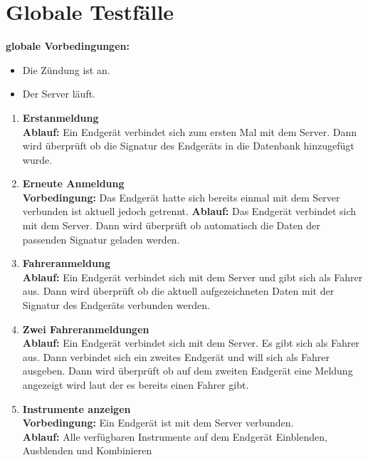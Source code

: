 \documentclass[pflichtenheft.tex]{subfiles}
\begin{document}
\chapter{Globale Testfälle}

\renewcommand{\theenumi}{/GT\ifnum \value{enumi}<10 0\fi\arabic{enumi}0/}
\renewcommand{\labelenumi}{\theenumi}
\renewcommand{\theenumii}{\arabic{enumii}}
\renewcommand{\labelenumii}{GT\ifnum \value{enumi}<10 0\fi\arabic{enumi}\arabic{enumii}/}

\textbf{globale Vorbedingungen:}
\begin{itemize}
\item
Die Zündung ist an.
\item
Der Server läuft.
\end{itemize}

\begin{enumerate}

\item{\textbf{Erstanmeldung}} \\
\textbf{Ablauf: } Ein Endgerät verbindet sich zum ersten Mal mit dem Server. Dann wird überprüft ob die Signatur des Endgeräts in die Datenbank hinzugefügt wurde.

\item{\textbf{Erneute Anmeldung}} \\
\textbf{Vorbedingung: } Das Endgerät hatte sich bereits einmal mit dem Server verbunden ist aktuell jedoch getrennt.
\textbf{Ablauf: } Das Endgerät verbindet sich mit dem Server. Dann wird überprüft ob automatisch die Daten der passenden Signatur geladen werden.

\item{\textbf{Fahreranmeldung}} \\
\textbf{Ablauf: } Ein Endgerät verbindet sich mit dem Server und gibt sich als Fahrer aus. Dann wird überprüft ob die aktuell aufgezeichneten Daten mit der Signatur des Endgeräts verbunden werden.

\item{\textbf{Zwei Fahreranmeldungen}} \\
\textbf{Ablauf: } Ein Endgerät verbindet sich mit dem Server. Es gibt sich als Fahrer aus. Dann verbindet sich ein zweites Endgerät und will sich als Fahrer ausgeben. Dann wird überprüft ob auf dem zweiten Endgerät eine Meldung angezeigt wird laut der es bereits einen Fahrer gibt.

\item{\textbf{Instrumente anzeigen}} \\
\textbf{Vorbedingung: } Ein Endgerät ist mit dem Server verbunden. \\
\textbf{Ablauf: } Alle verfügbaren Instrumente auf dem Endgerät Einblenden, Ausblenden und Kombinieren


\end{enumerate}
\end{document}
